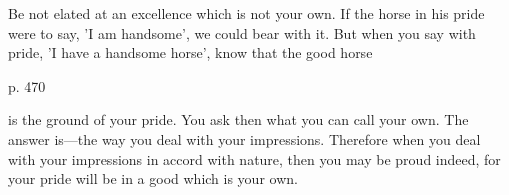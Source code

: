 Be not elated at an excellence which is not your own. If the horse in his pride
were to  say, 'I am  handsome', we could  bear with it.  But when you  say with
pride, 'I have a handsome horse', know that the good horse

p. 470

is the  ground of  your pride. You  ask then  what you can  call your  own. The
answer is—the  way you deal  with your  impressions. Therefore when  you deal
with your impressions in accord with nature,  then you may be proud indeed, for
your pride will be in a good which is your own.
